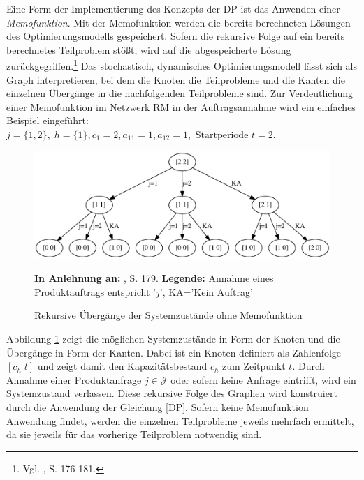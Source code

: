 Eine Form der Implementierung des Konzepts der DP ist das Anwenden einer \textit{Memofunktion}. Mit der Memofunktion werden die bereits berechneten Lösungen des Optimierungsmodells gespeichert. Sofern die rekursive Folge auf ein bereits berechnetes Teilproblem stößt, wird auf die abgespeicherte Lösung zurückgegriffen.\footnote{Vgl. \cite{hetland2010python}, S. 176-181.} Das stochastisch, dynamisches Optimierungsmodell lässt sich als Graph interpretieren, bei dem die Knoten die Teilprobleme und die Kanten die einzelnen Übergänge in die nachfolgenden Teilprobleme sind. Zur Verdeutlichung einer Memofunktion im Netzwerk RM in der Auftragsannahme wird ein einfaches Beispiel eingeführt: $j = \{1, 2\}, \; h = \{1\}, c_{1}=2, a_{11}=1, a_{12}=1, \text{ Startperiode } t=2.$

\begin{figure}[h!]
  \begin{center}
    \includegraphics[width=140mm]{Bilder/Einfach.pdf}
    \caption{Rekursive Übergänge der Systemzustände ohne Memofunktion}  \label{Einfach}
        {\footnotesize \textbf{In Anlehnung an:} \cite{hetland2010python}, S. 179.} 
    {\footnotesize \textbf{Legende:} Annahme eines Produktauftrags entspricht '$j$', KA='Kein Auftrag'} 
  \end{center}
\end{figure}

Abbildung \ref{Einfach} zeigt die möglichen Systemzustände in Form der Knoten und die Übergänge in Form der Kanten. Dabei ist ein Knoten definiert als Zahlenfolge $[c_h\; t]$ und zeigt damit den Kapazitätsbestand $c_h$ zum Zeitpunkt $t$. Durch Annahme einer Produktanfrage $j\in\mathcal{J}$ oder sofern keine Anfrage eintrifft, wird ein Systemzustand verlassen. Diese rekursive Folge des Graphen wird konstruiert durch die Anwendung der Gleichung \eqref{DP}. Sofern keine Memofunktion Anwendung findet, werden die einzelnen Teilprobleme jeweils mehrfach ermittelt, da sie jeweils für das vorherige Teilproblem notwendig sind.

